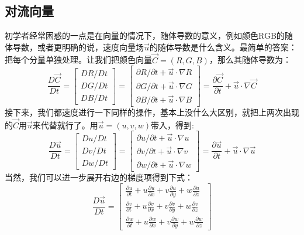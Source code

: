 \documentclass{article}
\begin{document}
\subsection{对流向量}
初学者经常困惑的一点是在向量的情况下，随体导数的意义，例如颜色RGB的随体导数，或者更明确的说，速度向量场$\vec{u}$的随体导数是什么含义。最简单的答案：把每个分量单独处理。让我们把颜色向量$\vec{C}=(R,G,B)$，那么其随体导数为：
\begin{equation}
\frac{D\vec{C}}{Dt}=\begin{bmatrix}
    DR/Dt \\
    DG/Dt \\
    DB/Dt
\end{bmatrix}=\begin{bmatrix}
\partial{R}/\partial{t}+\vec{u}\cdot\nabla{R} \\
\partial{G}/\partial{t}+\vec{u}\cdot\nabla{G} \\
\partial{B}/\partial{t}+\vec{u}\cdot\nabla{B}
\end{bmatrix}=\frac{\partial{\vec{C}}}{\partial{t}}+\vec{u}\cdot\nabla\vec{C} \label{advect_vector}
\end{equation}
接下来，我们都速度进行一下同样的操作，基本上没什么大区别，就把上两次出现的$\vec{C}$用$\vec{u}$来代替就行了。用$\vec{u}=(u,v,w)$带入，得到:
\begin{equation}
\frac{D\vec{u}}{Dt}=\begin{bmatrix}
Du/Dt \\
Dv/Dt \\
Dw/Dt
\end{bmatrix}=\begin{bmatrix}
\partial{u}/\partial{t} + \vec{u}\cdot\nabla{u} \\
\partial{v}/\partial{t} + \vec{u}\cdot\nabla{v} \\
\partial{w}/\partial{t} + \vec{u}\cdot\nabla{w}
\end{bmatrix}=\frac{\partial{\vec{u}}}{\partial{t}}+\vec{u}\cdot\nabla{\vec{u}}
\end{equation}
当然，我们可以进一步展开右边的梯度项得到下式：
\begin{equation}
\frac{D\vec{u}}{Dt}=\begin{bmatrix}
\frac{\partial{u}}{\partial{t}} + u\frac{\partial{u}}{\partial{x}} + v\frac{\partial{u}}{\partial{y}} + w\frac{\partial{u}}{\partial{z}} \\
\frac{\partial{v}}{\partial{t}} + u\frac{\partial{v}}{\partial{x}} + v\frac{\partial{v}}{\partial{y}} + w\frac{\partial{v}}{\partial{z}} \\
\frac{\partial{w}}{\partial{t}} + u\frac{\partial{w}}{\partial{x}} + v\frac{\partial{w}}{\partial{y}} + w\frac{\partial{w}}{\partial{z}}
\end{bmatrix}
\end{equation}
\end{document}
